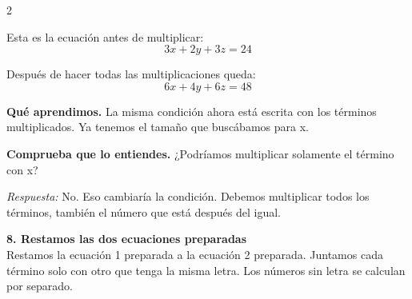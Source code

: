 \documentclass[11pt,a4paper,landscape]{article}
\begin{document}
\begin{multicols*}{2}
\begin{minipage}{\linewidth}
\par\smallskip Esta es la ecuación antes de multiplicar:
\[3x + 2y + 3z = 24\]
\par{}\par\smallskip
\par\smallskip Después de hacer todas las multiplicaciones queda:
\[6x + 4y + 6z = 48\]
\par\smallskip\textbf{Qué aprendimos.} La misma condición ahora está escrita con los términos multiplicados. Ya tenemos el tamaño que buscábamos para x.
\par\smallskip\textbf{Comprueba que lo entiendes.} ¿Podríamos multiplicar solamente el término con x?\par\textit{Respuesta:} No. Eso cambiaría la condición. Debemos multiplicar todos los términos, también el número que está después del igual.
\end{minipage}\par\medskip
\noindent\begin{minipage}{\linewidth}\textbf{8. Restamos las dos ecuaciones preparadas}\\[2pt]Restamos la ecuación 1 preparada a la ecuación 2 preparada. Juntamos cada término solo con otro que tenga la misma letra. Los números sin letra se calculan por separado.
\par{}\par\smallskip

\end{minipage}
\end{multicols*}
\end{document}
